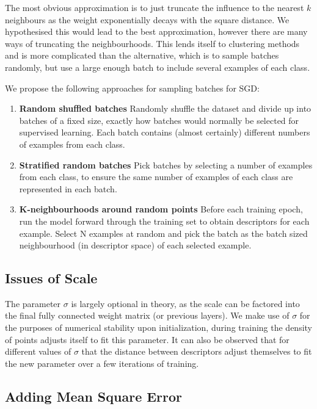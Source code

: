 The most obvious approximation is to just truncate the influence to the nearest $ k $ neighbours as the weight exponentially decays with the square distance. We hypothesised this would lead to the best approximation, however there are many ways of truncating the neighbourhoods. This lends itself to clustering methods and is more complicated than the alternative, which is to sample batches randomly, but use a large enough batch to include several examples of each class.

We propose the following approaches for sampling batches for \gls{SGD}:

\begin{enumerate}
\item {\bf Random shuffled batches}
 Randomly shuffle the dataset and divide up into batches of a fixed size, exactly how batches would normally be selected for supervised learning. Each batch contains (almost certainly) different numbers of examples from each class.
 \item {\bf Stratified random batches} 
 Pick batches by selecting a number of examples from each class, to ensure the same number of examples of each class are represented in each batch.   

 \item {\bf K-neighbourhoods around random points}
 Before each training epoch, run the model forward through the training set to obtain descriptors for each example. Select N examples at random and pick the batch as the batch sized neighbourhood (in descriptor space) of each selected example.
\end {enumerate}


\subsection {Issues of Scale}

The parameter $ \sigma $ is largely optional in theory, as the scale can be factored into the final fully connected weight matrix (or previous layers).  We make use of $ \sigma $ for the purposes of numerical stability upon initialization, during training the density of points adjusts itself to fit this parameter. It can also be observed that for different values of $ \sigma $ that the distance between descriptors adjust themselves to fit the new parameter over a few iterations of training.


\subsection {Adding Mean Square Error}


